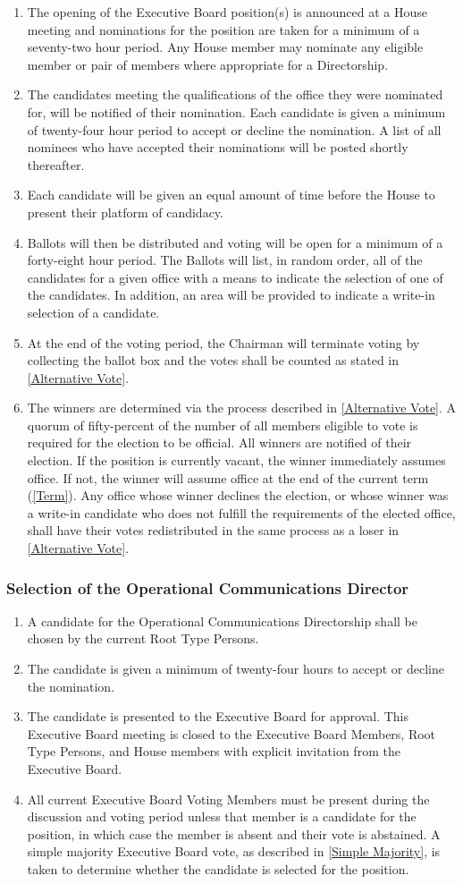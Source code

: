 \documentclass{article}
\newcommand{\asubsection}[1]{\subsubsection{#1} \label{#1}}
\begin{document}
\begin{enumerate}
	\item The opening of the Executive Board position(s) is announced at a House meeting and nominations for the position are taken for a minimum of a seventy-two hour period. Any House member may nominate any eligible member or pair of members where appropriate for a Directorship.
	\item The candidates meeting the qualifications of the office they were nominated for, will be notified of their nomination. Each candidate is given a minimum of twenty-four hour period to accept or decline the nomination. A list of all nominees who have accepted their nominations will be posted shortly thereafter.
	\item Each candidate will be given an equal amount of time before the House to present their platform of candidacy.
	\item Ballots will then be distributed and voting will be open for a minimum of a forty-eight hour period. The Ballots will list, in random order, all of the candidates for a given office with a means to indicate the selection of one of the candidates. In addition, an area will be provided to indicate a write-in selection of a candidate.
	\item At the end of the voting period, the Chairman will terminate voting by collecting the ballot box and the votes shall be counted as stated in \ref{Alternative Vote}.
	\item The winners are determined via the process described in \ref{Alternative Vote}. A quorum of fifty-percent of the number of all members eligible to vote is required for the election to be official. All winners are notified of their election. If the position is currently vacant, the winner immediately assumes office. If not, the winner will assume office at the end of the current term (\ref{Term}). Any office whose winner declines the election, or whose winner was a write-in candidate who does not fulfill the requirements of the elected office, shall have their votes redistributed in the same process as a loser in \ref{Alternative Vote}.
\end{enumerate}
\asubsection{Selection of the Operational Communications Director}
\begin{enumerate}
	\item A candidate for the Operational Communications Directorship shall be chosen by the current Root Type Persons.
	\item The candidate is given a minimum of twenty-four hours to accept or decline the nomination.
	\item The candidate is presented to the Executive Board for approval. This Executive Board meeting is closed to the Executive Board Members, Root Type Persons, and House members with explicit invitation from the Executive Board.
	\item All current Executive Board Voting Members must be present during the discussion and voting period unless that member is a candidate for the position, in which case the member is absent and their vote is abstained. A simple majority Executive Board vote, as described in \ref{Simple Majority}, is taken to determine whether the candidate is selected for the position.
\end{enumerate}
\end{document}
